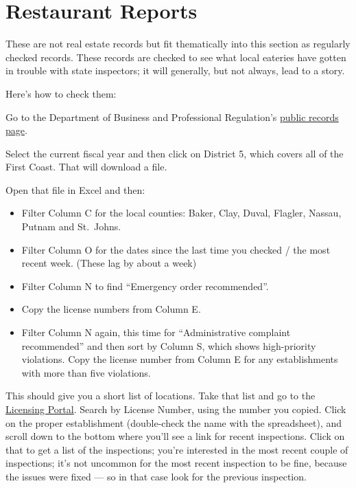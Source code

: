 \documentclass[
  11pt,
  american,
  letterpaperpaper,
  extrafontsizes,onecolumn,openright
  ]{memoir}
\providecommand{\tightlist}{%
  \setlength{\itemsep}{0pt}\setlength{\parskip}{0pt}}
\begin{document}
\hypertarget{restaurant-reports}{%
\section*{Restaurant Reports}\label{restaurant-reports}}

These are not real estate records but fit thematically into this section as regularly checked records. These records are checked to see what local eateries have gotten in trouble with state inspectors; it will generally, but not always, lead to a story.

Here's how to check them:

Go to the Department of Business and Professional Regulation's \href{http://www.myfloridalicense.com/DBPR/hotels-restaurants/public-records/\#1506344763000-101d4ee5-7a59}{public records page}.

Select the current fiscal year and then click on District 5, which covers all of the First Coast. That will download a file.

Open that file in Excel and then:

\begin{itemize}
\tightlist
\item
  Filter Column C for the local counties: Baker, Clay, Duval, Flagler, Nassau, Putnam and St.~Johns.
\item
  Filter Column O for the dates since the last time you checked / the most recent week. (These lag by about a week)
\item
  Filter Column N to find \enquote{Emergency order recommended}.
\item
  Copy the license numbers from Column E.
\item
  Filter Column N again, this time for \enquote{Administrative complaint recommended} and then sort by Column S, which shows high-priority violations. Copy the license number from Column E for any establishments with more than five violations.
\end{itemize}

This should give you a short list of locations. Take that list and go to the \href{https://www.myfloridalicense.com/wl11.asp}{Licensing Portal}. Search by License Number, using the number you copied. Click on the proper establishment (double-check the name with the spreadsheet), and scroll down to the bottom where you'll see a link for recent inspections. Click on that to get a list of the inspections; you're interested in the most recent couple of inspections; it's not uncommon for the most recent inspection to be fine, because the issues were fixed --- so in that case look for the previous inspection.
\end{document}
